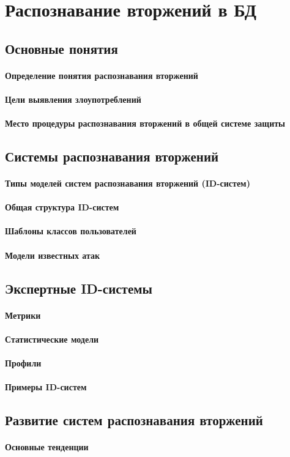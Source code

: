 \section{Распознавание вторжений в БД}
\subsection{Основные понятия}
\paragraph{Определение понятия распознавания вторжений}
\paragraph{Цели выявления злоупотреблений}
\paragraph{Место процедуры распознавания вторжений в общей системе защиты}

\subsection{Системы распознавания вторжений}
\paragraph{Типы моделей систем распознавания вторжений (ID-систем)}
\paragraph{Общая структура ID-систем}
\paragraph{Шаблоны классов пользователей}
\paragraph{Модели известных атак}

\subsection{Экспертные ID-системы}
\paragraph{Метрики}
\paragraph{Статистические модели}
\paragraph{Профили}
\paragraph{Примеры ID-систем}

\subsection{Развитие систем распознавания вторжений}
\paragraph{Основные тенденции}